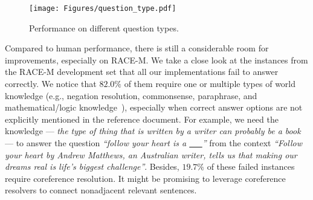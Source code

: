 \documentclass[11pt,a4paper]{article}
\newcommand{\eg}{{e.g.}}
\begin{document}
\begin{figure}[!h]
   \begin{center}
   \texttt{[image: Figures/question\_type.pdf]}
\end{center}
 \caption{Performance on different question types.}
 \label{fig:eval:question_type}
\end{figure}


Compared to human performance, there is still a considerable room for improvements, especially on RACE-M. We take a close look at the instances from the RACE-M development set that all our implementations fail to answer correctly. We notice that $82.0\%$ of them require one or multiple types of world knowledge (\eg, negation resolution, commonsense, paraphrase, and mathematical/logic knowledge~\cite{sugawara2017prerequisite,sugawara2017evaluation,sugawara2018makes}), especially when correct answer options are not explicitly mentioned in the reference document. For example, we need the knowledge --- \emph{the type of thing that is written by a writer can probably be a book} --- to answer the question \emph{``follow your heart is a \underline{~~~}''} from the context \emph{``Follow your heart by Andrew Matthews, an Australian writer, tells us that making our dreams real is life's biggest challenge''}. Besides, $19.7\%$ of these failed instances require coreference resolution. It might be promising to leverage coreference resolvers to connect nonadjacent relevant sentences.
\end{document}
